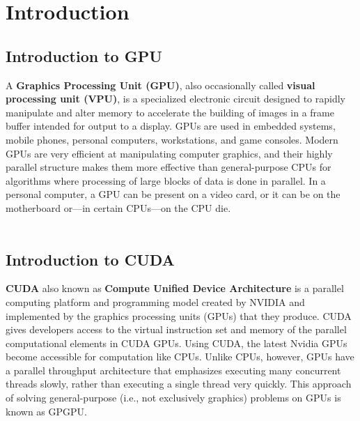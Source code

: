 \chapter{Introduction}

\section{Introduction to GPU}
A \textbf{Graphics Processing Unit (GPU)}, also occasionally called \textbf{visual processing unit (VPU)}, is a specialized electronic circuit designed to rapidly manipulate and alter memory to accelerate the building of images in a frame buffer intended for output to a display. GPUs are used in embedded systems, mobile phones, personal computers, workstations, and game consoles. Modern GPUs are very efficient at manipulating computer graphics, and their highly parallel structure makes them more effective than general-purpose CPUs for algorithms where processing of large blocks of data is done in parallel. In a personal computer, a GPU can be present on a video card, or it can be on the motherboard or—in certain CPUs—on the CPU die. \\\\

\section{Introduction to CUDA}

\textbf{CUDA} also known as \textbf{Compute Unified Device Architecture} is a parallel computing platform and programming model created by NVIDIA and implemented by the graphics processing units (GPUs) that they produce. CUDA gives developers access to the virtual instruction set and memory of the parallel computational elements in CUDA GPUs. Using CUDA, the latest Nvidia GPUs become accessible for computation like CPUs. Unlike CPUs, however, GPUs have a parallel throughput architecture that emphasizes executing many concurrent threads slowly, rather than executing a single thread very quickly. This approach of solving general-purpose (i.e., not exclusively graphics) problems on GPUs is known as GPGPU.

